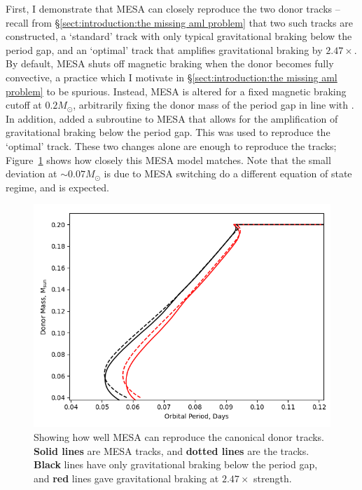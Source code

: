 First, I demonstrate that MESA can closely reproduce the two \citet{knigge11} donor tracks -- recall from \S\ref{sect:introduction:the missing aml problem} that two such tracks are constructed, a `standard' track with only typical gravitational braking below the period gap, and an `optimal' track that amplifies gravitational braking by $2.47\times$.
By default, MESA shuts off magnetic braking when the donor becomes fully convective, a practice which I motivate in \S\ref{sect:introduction:the missing aml problem} to be spurious. Instead, MESA is altered for a fixed magnetic braking cutoff at $0.2 M_\odot$, arbitrarily fixing the donor mass of the period gap in line with \citet{knigge11}.
In addition, \citet{Pala2017a} added a subroutine to MESA that allows for the amplification of gravitational braking below the period gap. This was used to reproduce the `optimal' track. These two changes alone are enough to reproduce the \citet{knigge11} tracks; Figure~\ref{fig:modelling:MESA can reproduce the K11 tracks} shows how closely this MESA model matches. Note that the small deviation at $\sim 0.07 M_\odot$ is due to MESA switching do a different equation of state regime, and is expected.
\begin{figure}
    \centering
    \includegraphics[width=.9\textwidth]{figures/modelling/compare_K11_withspot_normb_and_1xrmb_fixedcutoff.png}
    \caption{Showing how well MESA can reproduce the canonical \citet{knigge11} donor tracks. {\bf Solid lines} are MESA tracks, and {\bf dotted lines} are the \citet{knigge11} tracks. {\bf Black} lines have only gravitational braking below the period gap, and {\bf red} lines gave gravitational braking at $2.47\times$ strength.}
    \label{fig:modelling:MESA can reproduce the K11 tracks}
\end{figure}

